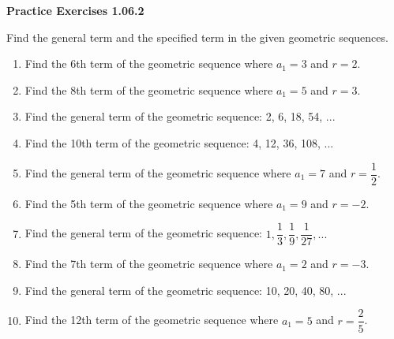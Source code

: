 \vspace{0.3ex}
\noindent\textbf{Practice Exercises 1.06.2}

\vspace{0.2ex}

Find the general term and the specified term in the given geometric sequences.
\begin{enumerate}
    \item Find the 6th term of the geometric sequence where \( a_1 = 3 \) and \( r = 2 \).
    \item Find the 8th term of the geometric sequence where \( a_1 = 5 \) and \( r = 3 \).
    \item Find the general term of the geometric sequence: 2, 6, 18, 54, ...
    \item Find the 10th term of the geometric sequence: 4, 12, 36, 108, ...
    \item Find the general term of the geometric sequence where \( a_1 = 7 \) and \( r = \dfrac{1}{2} \).
    \item Find the 5th term of the geometric sequence where \( a_1 = 9 \) and \( r = -2 \).
    \item Find the general term of the geometric sequence: \(1, \dfrac{1}{3}, \dfrac{1}{9}, \dfrac{1}{27}, ...\)
    \item Find the 7th term of the geometric sequence where \( a_1 = 2 \) and \( r = -3 \).
    \item Find the general term of the geometric sequence: 10, 20, 40, 80, ...
    \item Find the 12th term of the geometric sequence where \( a_1 = 5 \) and \( r = \dfrac{2}{5} \).
\end{enumerate}
